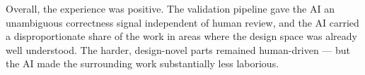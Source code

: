 Overall, the experience was positive.
The validation pipeline gave the AI an unambiguous correctness signal independent of human review, and the AI carried a disproportionate share of the work in areas where the design space was already well understood.
The harder, design-novel parts remained human-driven --- but the AI made the surrounding work substantially less laborious.

